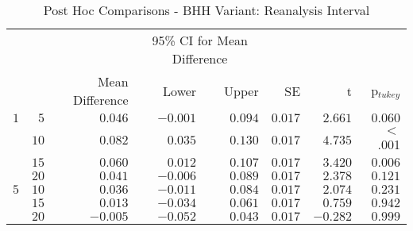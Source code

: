 \begin{table}[H]
	\centering
	\caption{Post Hoc Comparisons - BHH Variant: Reanalysis Interval}
	\label{tab:results:reanalysis:post_hoc}%
	\par\bigskip
	\resizebox{0.95\textwidth}{!}
	{
		\begin{tabular}{lrrrrrrr}
			\toprule
			\multicolumn{1}{c}{} & \multicolumn{1}{c}{} & \multicolumn{1}{c}{} & \multicolumn{2}{c}{95\% CI for Mean Difference} & \multicolumn{1}{c}{} & \multicolumn{1}{c}{} & \multicolumn{1}{c}{}               \\
			\cline{4-5}
			$ $                  & $ $                  & Mean Difference      & Lower                                           & Upper                & SE                   & t                    & p$_{tukey}$ \\
			\cmidrule[0.4pt]{1-8}
			$1$                  & $5$                  & $0.046$              & $-0.001$                                        & $0.094$              & $0.017$              & $2.661$              & $0.060$     \\
			$ $                  & $10$                 & $0.082$              & $0.035$                                         & $0.130$              & $0.017$              & $4.735$              & $<$ .001    \\
			                     & $15$                 & $0.060$              & $0.012$                                         & $0.107$              & $0.017$              & $3.420$              & $0.006$     \\
			                     & $20$                 & $0.041$              & $-0.006$                                        & $0.089$              & $0.017$              & $2.378$              & $0.121$     \\
			$5$                  & $10$                 & $0.036$              & $-0.011$                                        & $0.084$              & $0.017$              & $2.074$              & $0.231$     \\
			$ $                  & $15$                 & $0.013$              & $-0.034$                                        & $0.061$              & $0.017$              & $0.759$              & $0.942$     \\
			                     & $20$                 & $-0.005$             & $-0.052$                                        & $0.043$              & $0.017$              & $-0.282$             & $0.999$     \\

\end{tabular}}
\end{table}
